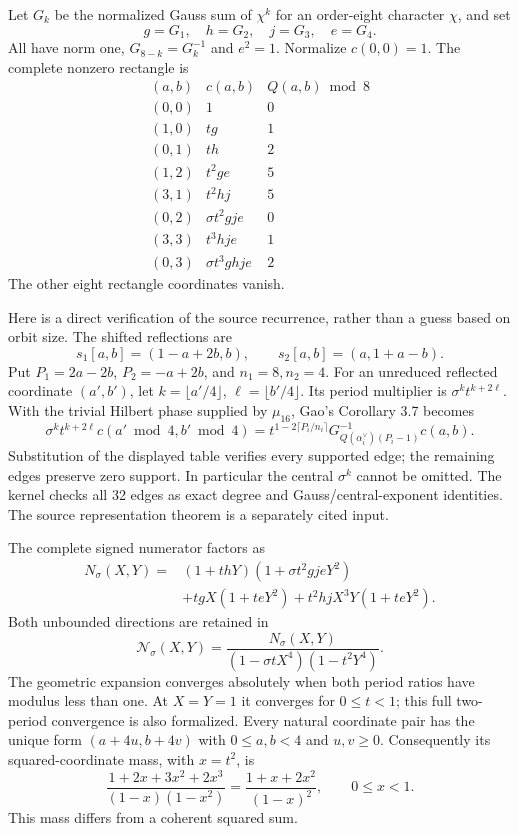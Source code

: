 \documentclass[11pt]{article}
\begin{document}
Let $G_k$ be the normalized Gauss sum of $\chi^k$ for an order-eight
character $\chi$, and set
\[
 g=G_1,\quad h=G_2,\quad j=G_3,\quad e=G_4.
\]
All have norm one, $G_{8-k}=G_k^{-1}$ and $e^2=1$.
Normalize $c(0,0)=1$. The complete nonzero rectangle is
\[
\begin{array}{c|c|c}
(a,b)&c(a,b)&Q(a,b)\bmod8\\ \hline
(0,0)&1&0\\
(1,0)&tg&1\\
(0,1)&th&2\\
(1,2)&t^2ge&5\\
(3,1)&t^2hj&5\\
(0,2)&\sigma t^2gje&0\\
(3,3)&t^3hje&1\\
(0,3)&\sigma t^3ghje&2
\end{array}
\]
The other eight rectangle coordinates vanish.

Here is a direct verification of the source recurrence, rather than
a guess based on orbit size. The shifted reflections are
\[
 s_1[a,b]=(1-a+2b,b),\qquad s_2[a,b]=(a,1+a-b).
\]
Put $P_1=2a-2b$, $P_2=-a+2b$, and $n_1=8,n_2=4$.
For an unreduced reflected coordinate $(a',b')$, let
$k=\lfloor a'/4\rfloor$, $\ell=\lfloor b'/4\rfloor$.
Its period multiplier is $\sigma^k t^{k+2\ell}$.
With the trivial Hilbert phase supplied by $\mu_{16}$, Gao's
Corollary 3.7 becomes
\[
 \sigma^k t^{k+2\ell}c(a'\bmod4,b'\bmod4)
 =t^{1-2\lceil P_i/n_i\rceil}
   G_{Q(\alpha_i^\vee)(P_i-1)}^{-1}c(a,b).
\]
Substitution of the displayed table verifies every supported edge;
the remaining edges preserve zero support. In particular the central
$\sigma^k$ cannot be omitted. The kernel checks all 32 edges as exact
degree and Gauss/central-exponent identities.
The source representation theorem is a separately cited input.

The complete signed numerator factors as
\[
\begin{split}
 N_\sigma(X,Y)={}&
 (1+thY)(1+\sigma t^2gjeY^2)\\
 &+tgX(1+teY^2)+t^2hjX^3Y(1+teY^2).
\end{split}
\]
Both unbounded directions are retained in
\[
 \mathcal N_\sigma(X,Y)=
 \frac{N_\sigma(X,Y)}
 {(1-\sigma tX^4)(1-t^2Y^4)}.
\]
The geometric expansion converges absolutely when both period ratios
have modulus less than one. At $X=Y=1$ it converges for $0\le t<1$;
this full two-period convergence is also formalized.
Every natural coordinate pair has the unique form
$(a+4u,b+4v)$ with $0\le a,b<4$ and $u,v\ge0$.
Consequently its squared-coordinate mass, with $x=t^2$, is
\[
 \frac{1+2x+3x^2+2x^3}{(1-x)(1-x^2)}
 =\frac{1+x+2x^2}{(1-x)^2},\qquad 0\le x<1.
\]
This mass differs from a coherent squared sum.
\end{document}

